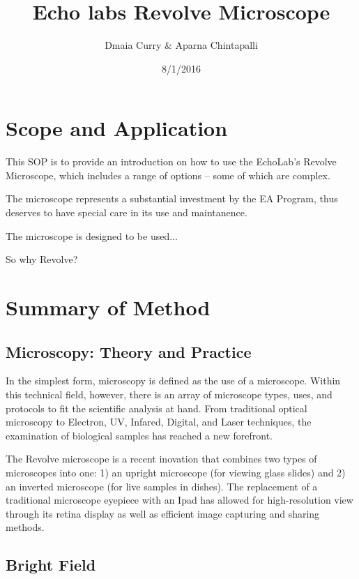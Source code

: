 \documentclass[12pt]{../SOP3_beta}
\title{Echo labs Revolve Microscope}
\author{Dmaia Curry \& Aparna Chintapalli}
\date{8/1/2016}
\begin{document}


\maketitle

\section{Scope and Application}

\NP This SOP is to provide an introduction on how to use the EchoLab's Revolve Microscope, which includes a range of options -- some of which are complex.

\NP The microscope represents a substantial investment by the EA Program, thus deserves to have special care in its use and maintanence. 

\NP The microscope is designed to be used...

\NP So why Revolve?

\section{Summary of Method}

\subsection*{Microscopy: Theory and Practice}

\NP In the simplest form, microscopy is defined as the use of a microscope. Within this technical field, however, there is an array of microscope types, uses, and protocols to fit the scientific analysis at hand. From traditional optical microscopy to Electron, UV, Infared, Digital, and Laser techniques, the examination of biological samples has reached a new forefront. 

\NP The Revolve microscope is a recent inovation that combines two types of microscopes into one: 1) an upright microscope (for viewing glass slides) and 2) an inverted microscope (for live samples in dishes). The replacement of a traditional microscope eyepiece with an Ipad has allowed for high-resolution view through its retina display as well as efficient image capturing and sharing methods.

\subsection*{Bright Field}
\end{document}
